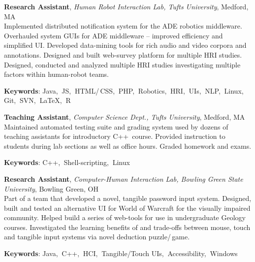 \documentclass[10pt, letter]{article}
\newcommand{\years}[1]{\marginnote{\footnotesize #1}}
\newenvironment{desc*}{
  \begin{description}
    \setlength{\itemsep}{0.2pt}
    \setlength{\parskip}{-1pt}
    \setlength{\parsep}{0pt}
  }{
  \end{description}
}
\begin{document}
\vspace{-.2cm}
\years{2012 - 2014} 
\textbf{\fontsize{10.5pt}{1em}\selectfont Research Assistant}, 
\textsl{Human Robot Interaction Lab, Tufts University}, Medford, MA\\ 

\vspace{-.3cm} 
Implemented distributed notification system for the ADE robotics
middleware. Overhauled system GUIs for ADE middleware -- improved
efficiency and simplified UI. Developed data-mining tools for rich
audio and video corpora and annotations. Designed and built web-survey
platform for multiple HRI studies. Designed, conducted and analyzed
multiple HRI studies investigating multiple factors within human-robot
teams.
\vspace{-.1cm}
\begin{desc*}
\item[\rm \textbf{Keywords}:] Java,$\:$ JS,$\:$ HTML/\,CSS,$\:$ PHP,$\:$ Robotics,$\:$
  HRI,$\:$ UIs,$\:$ NLP,$\:$ Linux,$\:$ Git,$\:$ SVN,$\:$ \LaTeX,$\:$ R\\
\end{desc*}

\vspace{-.2cm}
\years{2012, 2013} 
\textbf{\fontsize{10.5pt}{1em}\selectfont Teaching Assistant}, 
\textsl{Computer Science Dept., Tufts University}, Medford, MA \\ 

\vspace{-.3cm}
Maintained automated testing suite and grading system used by dozens
of teaching assistants for introductory C++\, course. Provided
instruction to students during lab sections as well as office hours.
Graded homework and exams.
\vspace{-.1cm}
\begin{desc*}
\item[\rm \textbf{Keywords}:] C++,$\:$ Shell-scripting,$\:$ Linux\\
\end{desc*}

\vspace{-.2cm}
\years{2010 - 2012}
\textbf{\fontsize{10.5pt}{1em}\selectfont Research Assistant}, 
\textsl{Computer-Human Interaction Lab, Bowling Green State
  University}, Bowling Green, OH \\

\vspace{-.3cm}
Part of a team that developed a novel, tangible password input system.
Designed, built and tested an alternative UI for World of Warcraft for
the visually impaired community. Helped build a series of web-tools
for use in undergraduate Geology courses. Investigated the learning
benefits of and trade-offs between mouse, touch and tangible input
systems via novel deduction puzzle/\,game.
\vspace{-.1cm}
\begin{desc*}
\item[\rm \textbf{Keywords}:] Java,$\:$ C++,$\:$ HCI,$\:$ Tangible/Touch UIs,$\:$ Accessibility,$\:$ Windows\\
\end{desc*}
\end{document}
